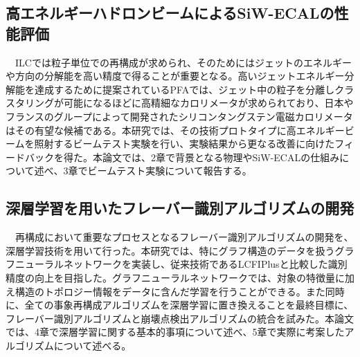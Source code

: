 \subsection{高エネルギーハドロンビームによるSiW-ECALの性能評価}
　ILCでは粒子単位での再構成が求められ、そのためにはジェットのエネルギーや方向の分解能を高い精度で得ることが重要となる。高いジェットエネルギー分解能を達成するために提案されているPFAでは、ジェット中の粒子を分離しクラスタリングが可能になるほどに高精細なカロリメータが求められており、日本やフランスのグループによって開発されたシリコンタングステン電磁カロリメータはその有望な候補である。本研究では、その技術プロトタイプに高エネルギービームを照射するビームテスト実験を行い、実験結果から更なる改善に向けたフィードバックを得た。本論文では、2章で背景となる物理やSiW-ECALの仕組みについて述べ、3章でビームテスト実験について報告する。\\
\subsection{深層学習を用いたフレーバー識別アルゴリズムの開発}
　再構成において重要なプロセスとなるフレーバー識別アルゴリズムの開発を、深層学習技術を用いて行った。本研究では、特にグラフ構造のデータを扱うグラフニューラルネットワークを実装し、従来技術であるLCFIPlusと比較した識別精度の向上を目指した。グラフニューラルネットワークでは、対象の特徴量に加え構造のトポロジー情報をデータに含んだ学習を行うことができる。また同時に、全ての事象再構成アルゴリズムを深層学習に置き換えることを最終目標に、フレーバー識別アルゴリズムと崩壊点検出アルゴリズムの統合を試みた。本論文では、4章で深層学習に関する基本的事項について述べ、5章で実際に考案したアルゴリズムについて述べる。